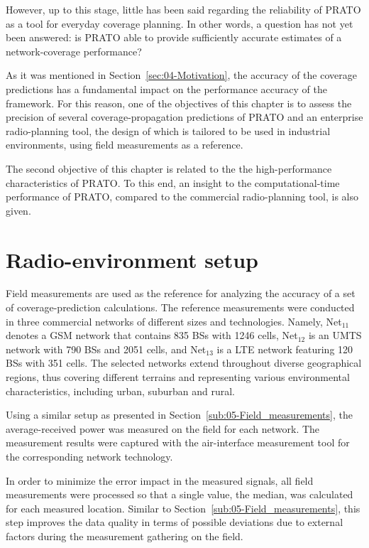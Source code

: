 However, up to this stage, little has been said regarding the reliability
of PRATO as a tool for everyday coverage planning. In other words,
a question has not yet been answered: is PRATO able to provide sufficiently
accurate estimates of a network-coverage performance?

As it was mentioned in Section~\ref{sec:04-Motivation}, the accuracy
of the coverage predictions has a fundamental impact on the performance
accuracy of the framework. For this reason, one of the objectives
of this chapter is to assess the precision of several coverage-propagation
predictions of PRATO and an enterprise radio-planning tool, the design
of which is tailored to be used in industrial environments, using
field measurements as a reference.

The second objective of this chapter is related to the the high-performance
characteristics of PRATO. To this end, an insight to the computational-time
performance of PRATO, compared to the commercial radio-planning tool,
is also given.


\section{Radio-environment setup \label{sec:08-Radio_environment_setup}}

Field measurements are used as the reference for analyzing the accuracy
of a set of coverage-prediction calculations. The reference measurements
were conducted in three commercial networks of different sizes and
technologies. Namely, Net$_{11}$ denotes a GSM network that contains
835 BSs with 1246 cells, Net$_{12}$ is an UMTS network with 790 BSs
and 2051 cells, and Net$_{13}$ is a LTE network featuring 120 BSs
with 351 cells. The selected networks extend throughout diverse geographical
regions, thus covering different terrains and representing various
environmental characteristics, including urban, suburban and rural.

Using a similar setup as presented in Section~\ref{sub:05-Field_measurements},
the average-received power was measured on the field for each network.
The measurement results were captured with the air-interface measurement
tool for the corresponding network technology.

In order to minimize the error impact in the measured signals, all
field measurements were processed so that a single value, the median,
was calculated for each measured location. Similar to Section~\ref{sub:05-Field_measurements},
this step improves the data quality in terms of possible deviations
due to external factors during the measurement gathering on the field.

